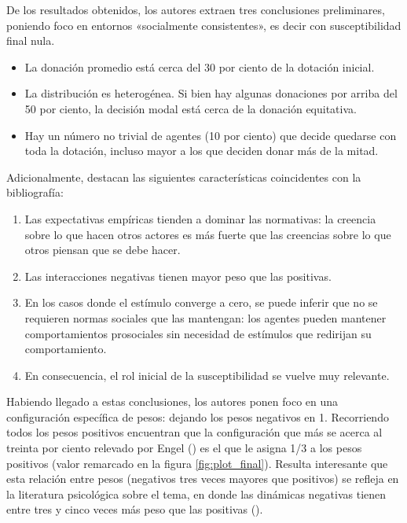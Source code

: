 \documentclass[12pt,a4paper]{article}
\begin{document}
De los resultados obtenidos, los autores extraen tres conclusiones preliminares, poniendo foco 
en entornos «socialmente consistentes», es decir con susceptibilidad final nula.

\begin{itemize}
\item La donación promedio está cerca del 30 por ciento de la dotación inicial.
\item La distribución es heterogénea. Si bien hay algunas donaciones por arriba del 50 por ciento, la decisión modal está 
cerca de la donación equitativa.
\item Hay un número no trivial de agentes (10 por ciento) que decide quedarse con toda la dotación, incluso mayor a los que
deciden donar más de la mitad.
\end{itemize}

Adicionalmente, destacan las siguientes características coincidentes con la bibliografía:

\begin{enumerate}
\item Las expectativas empíricas tienden a dominar las normativas: la creencia sobre lo que hacen otros actores es 
más fuerte que las creencias sobre lo que otros piensan que se debe hacer.
\item Las interacciones negativas tienen mayor peso que las positivas.
\item En los casos donde el estímulo converge a cero, se puede inferir que no se requieren normas sociales que 
las mantengan: los agentes pueden mantener comportamientos prosociales sin necesidad de estímulos que redirijan su 
comportamiento.
\item En consecuencia, el rol inicial de la susceptibilidad se vuelve muy relevante.
\end{enumerate}

Habiendo llegado a estas conclusiones, los autores ponen foco en una configuración específica de pesos: 
dejando los pesos negativos en 1. Recorriendo todos los pesos positivos encuentran que la configuración que más se 
acerca al treinta por ciento relevado por Engel (\citeyear{engel2011dictator}) es el que le asigna 1/3 a los pesos 
positivos (valor remarcado en la figura \ref{fig:plot_final}). Resulta interesante que esta relación entre pesos
(negativos tres veces mayores que positivos) se refleja en la literatura psicológica sobre el tema, 
en donde las dinámicas negativas tienen entre tres y cinco veces más peso que las positivas (\cite{coleman2021live,
fredrickson2013updated}).
\end{document}
